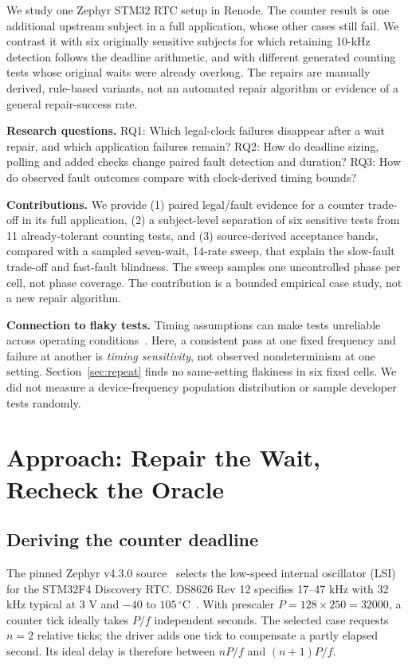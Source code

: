 \documentclass[sigconf,nonacm,balance=false]{acmart}
\begin{document}
We study one Zephyr STM32 RTC setup in Renode. The counter result is one additional upstream subject in a full application, whose other cases still fail. We contrast it with six originally sensitive subjects for which retaining 10-kHz detection follows the deadline arithmetic, and with different generated counting tests whose original waits were already overlong. The repairs are manually derived, rule-based variants, not an automated repair algorithm or evidence of a general repair-success rate.

\textbf{Research questions.} RQ1: Which legal-clock failures disappear after a wait repair, and which application failures remain? RQ2: How do deadline sizing, polling and added checks change paired fault detection and duration? RQ3: How do observed fault outcomes compare with clock-derived timing bounds?

\textbf{Contributions.} We provide (1) paired legal/fault evidence for a counter trade-off in its full application, (2) a subject-level separation of six sensitive tests from 11 already-tolerant counting tests, and (3) source-derived acceptance bands, compared with a sampled seven-wait, 14-rate sweep, that explain the slow-fault trade-off and fast-fault blindness. The sweep samples one uncontrolled phase per cell, not phase coverage. The contribution is a bounded empirical case study, not a new repair algorithm.

\textbf{Connection to flaky tests.} Timing assumptions can make tests unreliable across operating conditions~\cite{luo2014flaky,strandberg2020,rahman2024flakerake}. Here, a consistent pass at one fixed frequency and failure at another is \emph{timing sensitivity}, not observed nondeterminism at one setting. Section~\ref{sec:repeat} finds no same-setting flakiness in six fixed cells. We did not measure a device-frequency population distribution or sample developer tests randomly.

\section{Approach: Repair the Wait, Recheck the Oracle}
\subsection{Deriving the counter deadline}
The pinned Zephyr v4.3.0 source~\cite{zephyrpinned} selects the low-speed internal oscillator (LSI) for the STM32F4 Discovery RTC. DS8626 Rev 12 specifies 17--47 kHz with 32 kHz typical at 3 V and $-40$ to $105\,^{\circ}$C~\cite{stm32f407datasheet}. With prescaler $P=128\times250=32000$, a counter tick ideally takes $P/f$ independent seconds. The selected case requests $n=2$ relative ticks; the driver adds one tick to compensate a partly elapsed second. Its ideal delay is therefore between $nP/f$ and $(n+1)P/f$.
\end{document}
